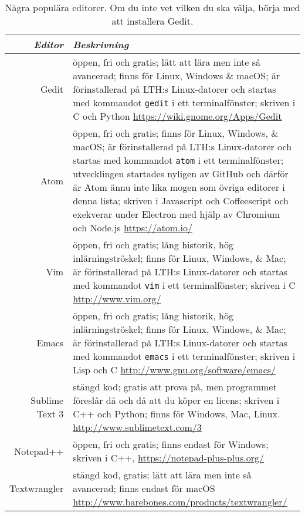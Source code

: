 \begin{table}[T]

\renewcommand{\arraystretch}{1.25}

\begin{tabular}{@{}r | p{}}
\textit{Editor} & \textit{Beskrivning} \\ \hline

Gedit & öppen, fri och gratis; lätt att lära men inte så avancerad; finns för Linux, Windows \& macOS; är förinstallerad på LTH:s Linux-datorer och startas med kommandot \verb+gedit+ i ett terminalfönster; skriven i C och Python \newline  
 \url{https://wiki.gnome.org/Apps/Gedit} \\

Atom & öppen, fri och gratis; finns för Linux, Windows, \& macOS; är förinstallerad på LTH:s Linux-datorer och startas med kommandot \verb+atom+ i ett terminalfönster; utvecklingen startades nyligen av GitHub och därför är Atom ännu inte lika mogen som övriga editorer i denna lista; skriven i Javascript och Coffeescript och exekverar under  Electron med hjälp av Chromium och Node.js \newline \url{https://atom.io/} \\

Vim & öppen, fri och gratis; lång historik, hög inlärningströskel; finns för Linux, Windows, \& Mac; är förinstallerad på LTH:s Linux-datorer och startas med kommandot \verb+vim+ i ett terminalfönster; skriven i C \newline \url{http://www.vim.org/} \\

Emacs & öppen, fri och gratis; lång historik, hög inlärningströskel; finns för Linux, Windows, \& Mac; är förinstallerad på LTH:s Linux-datorer och startas med kommandot \verb+emacs+ i ett terminalfönster; skriven i Lisp och C \newline \url{http://www.gnu.org/software/emacs/} \\

Sublime Text 3 & stängd kod; gratis att prova på, men programmet föreslår då och då att du köper en licens;  skriven i C++ och Python; finns för Windows, Mac, Linux. \newline
 \url{http://www.sublimetext.com/3} \\


Notepad++ & öppen, fri och gratis; finns endast för Windows; skriven i C++, \url{https://notepad-plus-plus.org/} \\


Textwrangler & stängd kod, gratis; lätt att lära men inte så avancerad; finns endast för macOS  
\newline \url{http://www.barebones.com/products/textwrangler/} \\

\end{tabular}
    \caption{Några populära editorer. Om du inte vet vilken du ska välja, börja med att installera Gedit.}
    \label{edit:popular-editors}
\end{table}